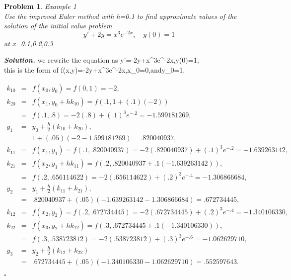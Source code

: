 \documentclass[12pt]{article}
\newtheorem{problem}{Problem}
\newenvironment{solution}[1][\it{Solution}]{\textbf{#1. } }{$\square$}
\begin{document}
\begin{problem}
Example 1 \\
Use the improved Euler method with h=0.1
to find approximate values of the solution of the initial value problem
\newline
\begin{equation} 
\label{eq:3.2.5}
y'+2y=x^3e^{-2x},\quad y(0)=1
\end{equation} at x=0.1,0.2,0.3
\end{problem}
\begin{solution}
we rewrite the equation as y'=-2y+x^3e^{-2x},\quad y(0)=1, \\ this is the form of f(x,y)=-2y+x^3e^{-2x},\quad x_0=0,\quad \mbox {and}\quad y_0=1.

\begin{eqnarray*} 
k_{10} & = & f(x_0,y_0)
= f(0,1)=-2,\\
k_{20} & = & f(x_1,y_0+hk_{10})=f(.1,1+(.1)(-2))\\
&=& f(.1,.8)=-2(.8)+(.1)^3e^{-.2}=-1.599181269,\\
y_1&=&y_0+\frac{h}{2}(k_{10}+k_{20}),\\



&=&1+(.05)(-2-1.599181269)=.820040937,\\
k_{11} & = & f(x_1,y_1)
= f(.1,.820040937)= -2(.820040937)+(.1)^3e^{-.2}=-1.639263142,\\
k_{21} & = & f(x_2,y_1+hk_{11})=f(.2,.820040937+.1(-1.639263142)),\\
&=&
f(.2,.656114622)=-2(.656114622)+(.2)^3e^{-.4}=-1.306866684,\\
y_2&=&y_1+\frac{h}{2}(k_{11}+k_{21}),\\
&=&.820040937+(.05)(-1.639263142-1.306866684)=.672734445,\\
k_{12} & = & f(x_2,y_2)
= f(.2,.672734445)= -2(.672734445)+(.2)^3e^{-.4}=-1.340106330,\\
k_{22} & = & f(x_3,y_2+hk_{12})=f(.3,.672734445+.1(-1.340106330)),\\
&=&
f(.3,.538723812)=-2(.538723812)+(.3)^3e^{-.6}=-1.062629710,\\
y_3&=&y_2+\frac{h}{2}(k_{12}+k_{22})\\
&=&.672734445+(.05)(-1.340106330-1.062629710)=.552597643.
\end{eqnarray*}

\end{solution}
\end{document}
